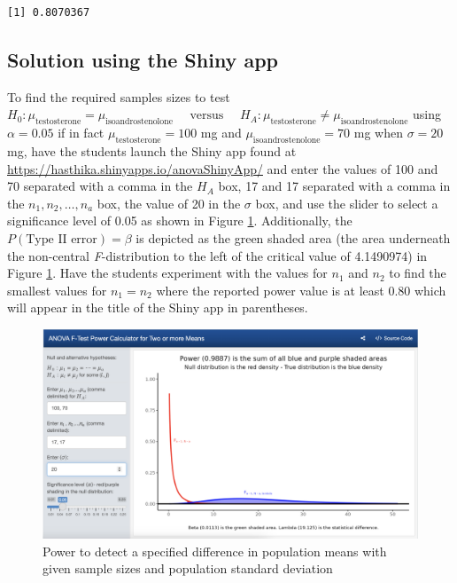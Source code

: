 \documentclass[
]{article}
\begin{document}
\begin{verbatim}
[1] 0.8070367
\end{verbatim}

\hypertarget{solution-using-the-shiny-app}{%
\subsection*{Solution using the Shiny app}\label{solution-using-the-shiny-app}}

To find the required samples sizes to test \(H_0: \mu_\text{testosterone} = \mu_\text{isoandrostenolone}\quad\text{ versus }\quad H_A: \mu_\text{testosterone} \neq \mu_\text{isoandrostenolone}\) using \(\alpha = 0.05\) if in fact \(\mu_\text{testosterone} = 100\) mg and \(\mu_\text{isoandrostenolone} = 70\) mg when \(\sigma = 20\) mg, have the students launch the Shiny app found at \url{https://hasthika.shinyapps.io/anovaShinyApp/} and enter the values of 100 and 70 separated with a comma in the \(H_A\) box, 17 and 17 separated with a comma in the \(n_1, n_2,\ldots, n_a\) box, the value of 20 in the \(\sigma\) box, and use the slider to select a significance level of 0.05 as shown in Figure \ref{fig:power1}. Additionally, the \(P(\text{Type II error}) = \beta\) is depicted as the green shaded area (the area underneath the non-central \emph{F}-distribution to the left of the critical value of 4.1490974) in Figure \ref{fig:power1}. Have the students experiment with the values for \(n_1\) and \(n_2\) to find the smallest values for \(n_1 = n_2\) where the reported power value is at least 0.80 which will appear in the title of the Shiny app in parentheses.

\begin{figure}

{\centering \includegraphics[width=5.96in]{fig-power1a} 

}

\caption{Power to detect a specified difference in population means with given sample sizes and population standard deviation}\label{fig:power1}
\end{figure}
\end{document}
